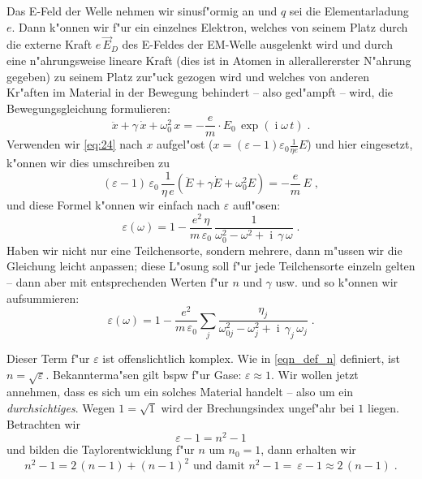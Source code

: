 \documentclass[twoside,a4paper]{book}
\newcommand{\I}{\ensuremath{\operatorname{i}}}
\newcommand{\abs}[0]{\bigskip \noindent}
\begin{document}
Das E-Feld der Welle nehmen wir sinusf"ormig an und $q$ sei die
Elementarladung $e$. Dann k"onnen wir f"ur ein einzelnes Elektron,
welches von seinem Platz durch die externe Kraft $e \, \vec E_D$ des
E-Feldes der EM-Welle ausgelenkt wird und durch eine n"ahrungsweise
lineare Kraft (dies ist in Atomen in allerallererster N"ahrung
gegeben) zu seinem Platz zur"uck gezogen wird und welches von anderen
Kr"aften im Material in der Bewegung behindert -- also ged"ampft --
wird, die Bewegungsgleichung formulieren:
\begin{equation}
   \label{eq:22}
   \ddot x + \gamma \, \dot x + \omega_0^2 \, x = -\frac{e}{m} \cdot
   E_0 \, \exp (\I \omega \, t) \;.
\end{equation}
Verwenden wir \eqref{eq:24} nach $x$ aufgel"ost ($x =
(\varepsilon-1)\varepsilon_0 \frac{1}{\eta e} E$) und hier eingesetzt,
k"onnen wir dies umschreiben zu
\begin{equation*}
   (\varepsilon-1)\, \varepsilon_0 \, \frac{1}{\eta \,e} \left ( \ddot E +
   \gamma \dot E + \omega_0^2E \right ) = - \frac{e}{m} \, E \;,
\end{equation*}
und diese Formel k"onnen wir einfach nach $\varepsilon$ aufl"osen:
\begin{equation}
   \label{eq:26}
   \varepsilon(\omega) = 1 - \frac{e^2 \, \eta}{m \, \varepsilon_0} \,
   \frac{1}{\omega_0^2 - \omega^2 + \I \, \gamma \, \omega} \;.
\end{equation}
Haben wir nicht nur eine Teilchensorte, sondern mehrere, dann m"ussen
wir die Gleichung leicht anpassen; diese L"osung soll f"ur jede
Teilchensorte einzeln gelten -- dann aber mit entsprechenden Werten
f"ur $n$ und $\gamma$ usw. und so k"onnen wir aufsummieren:
\begin{equation*}
   \varepsilon(\omega) = 1 - \frac{e^2}{m \, \varepsilon_0} \sum_j
   \frac{\eta_j}{\omega_{0j}^2 - \omega_j^2 + \I \, \gamma_j \, \omega_j} \;.
\end{equation*}


\abs
Dieser Term f"ur $\varepsilon$ ist offenslichtlich komplex. Wie in
\eqref{eqn_def_n} definiert, ist $n =
\sqrt{\varepsilon}$. Bekannterma"sen gilt bspw f"ur Gase: $\varepsilon
\approx 1$. Wir wollen jetzt annehmen, dass es sich um ein solches
Material handelt -- also um ein \emph{durchsichtiges}.
Wegen $1 = \sqrt{1}$ wird der Brechungsindex ungef"ahr bei $1$
liegen. Betrachten wir 
\begin{equation*}
   \varepsilon-1 = n^2 - 1
\end{equation*}
und bilden die Taylorentwicklung f"ur $n$ um $n_0 = 1$, dann erhalten
wir
\begin{equation}
\label{eq:27}
   n^2 - 1 = 2\, (n-1) + (n-1)^2 \text{ und damit } n^2 - 1 = ~
   \varepsilon-1 \approx
   2\, (n-1) \;.
\end{equation}
\end{document}
